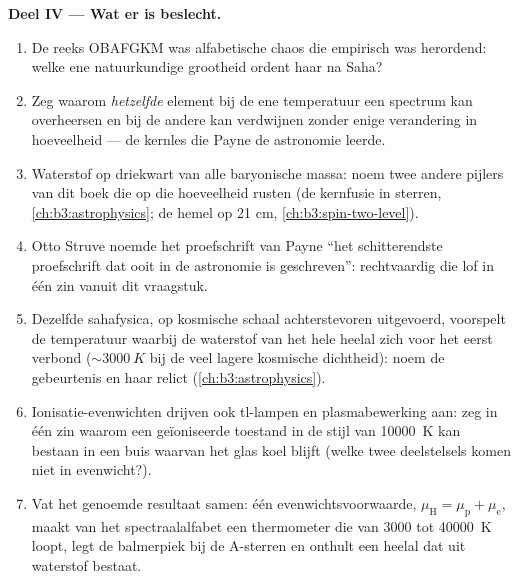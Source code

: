 \begin{problem}
\medskip\noindent\textbf{Deel IV --- Wat er is beslecht.}
\begin{enumerate}[resume]
  \item De reeks OBAFGKM was alfabetische chaos die empirisch was
        herordend: welke ene natuurkundige grootheid ordent haar na Saha?
  \item Zeg waarom \emph{hetzelfde} element bij de ene temperatuur een
        spectrum kan overheersen en bij de andere kan verdwijnen zonder
        enige verandering in hoeveelheid --- de kernles die Payne de
        astronomie leerde.
  \item Waterstof op driekwart van alle baryonische massa: noem twee
        andere pijlers van dit boek die op die hoeveelheid rusten (de
        kernfusie in sterren, \cref{ch:b3:astrophysics}; de hemel op 21 cm,
        \cref{ch:b3:spin-two-level}).
  \item Otto Struve noemde het proefschrift van Payne ``het schitterendste
        proefschrift dat ooit in de astronomie is geschreven'':
        rechtvaardig die lof in één zin vanuit dit vraagstuk.
  \item Dezelfde sahafysica, op kosmische schaal achterstevoren
        uitgevoerd, voorspelt de temperatuur waarbij de waterstof van het
        hele heelal zich voor het eerst verbond ($\sim\qty{3000}{K}$ bij
        de veel lagere kosmische dichtheid): noem de gebeurtenis en haar
        relict (\cref{ch:b3:astrophysics}).
  \item Ionisatie-evenwichten drijven ook tl-lampen en plasmabewerking
        aan: zeg in één zin waarom een geïoniseerde toestand in de stijl
        van \qty{10000}{K} kan bestaan in een buis waarvan het glas koel
        blijft (welke twee deelstelsels komen niet in evenwicht?).
  \item Vat het genoemde resultaat samen: één evenwichtsvoorwaarde,
        $\mu_{\text{H}} = \mu_{\text{p}} + \mu_{\text{e}}$, maakt van het
        spectraalalfabet een thermometer die van $3000$ tot \qty{40000}{K}
        loopt, legt de balmerpiek bij de A-sterren en onthult een heelal
        dat uit waterstof bestaat.
\end{enumerate}
\end{problem}
